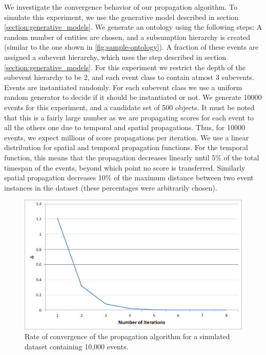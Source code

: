 We investigate the convergence behavior of our propagation algorithm. To simulate this experiment, we use the generative model described in section \ref{section:generative_models}. We generate an ontology using the following steps: A random number of entities are chosen, and a subsumption hierarchy is created (similar to the one shown in \ref{fig:sample-ontology}). A fraction of these events are assigned a subevent hierarchy, which uses the step described in section \ref{section:generative_models}. For this experiment we restrict the depth of the subevent hierarchy to be 2, and each event class to contain atmost 3 subevents. Events are instantiated randomly. For each subevent class we use a uniform random generator to decide if it should be instantiated or not. We generate 10000 events for this experiment, and a candidate set of 500 objects. It must be noted that this is a fairly large number as we are propagating scores for each event to all the others one due to temporal and spatial propagations. Thus, for 10000 events, we expect millions of score propagations per iteration. We use a linear distribution for spatial and temporal propagation functions. For the temporal function, this means that the propagation decreases linearly until 5\% of the total timespan of the events, beyond which point no score is transferred. Similarly spatial propagation decreases 10\% of the maximum distance between two event instances in the dataset (these percentages were arbitrarily chosen).

\begin{figure}[h!]
\centering
\includegraphics[width=\textwidth]{media/chapter6/conv/convergence-10K.png}
\caption{Rate of convergence of the propagation algorithm for a simulated dataset containing 10,000 events.}
\label{fig:convergences}
\end{figure}

